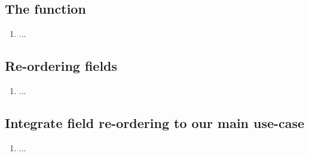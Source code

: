 \subsection{The  function}
\begin{enumerate}[resume*]
\item ...
\end{enumerate}

\subsection{Re-ordering fields}
\begin{enumerate}[resume*]
\item ...
\end{enumerate}

\subsection{Integrate field re-ordering to our main use-case}
\begin{enumerate}[resume*]
\item ...
\end{enumerate}
